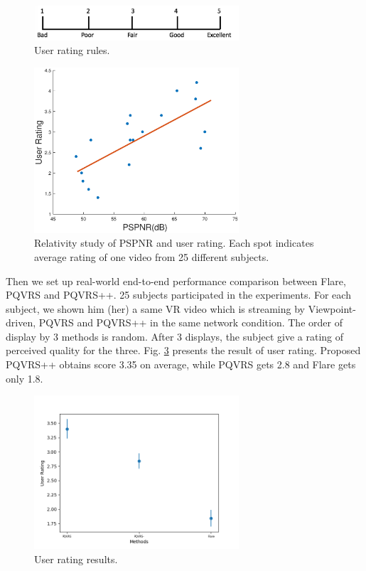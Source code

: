     \begin{figure}
  \centering
  \includegraphics[width=3in]{images/rating.jpg}
  \caption{User rating rules.}
  \label{rating_rules}
  \end{figure}

    \begin{figure}
  \centering
  \includegraphics[width=3in]{images/pspnr_mos.eps}
  \caption{Relativity study of PSPNR and user rating. Each spot indicates average rating of one video from 25 different subjects.}
  \label{pspnr_mos}
  \end{figure}

Then we set up real-world end-to-end performance comparison between Flare, PQVRS and PQVRS++. 25 subjects participated in the experiments. For each subject, we shown him (her) a same VR video which is streaming by Viewpoint-driven, PQVRS and PQVRS++ in the same network condition. The order of display by 3 methods is random. After 3 displays, the subject give a rating of perceived quality for the three. Fig. \ref{rating_res} presents the result of user rating. Proposed PQVRS++ obtains score 3.35 on average, while PQVRS gets 2.8 and Flare gets only 1.8.

    \begin{figure}
  \centering
  \includegraphics[width=3in]{images/rating_result.png}
  \caption{User rating results.}
  \label{rating_res}
  \end{figure}

